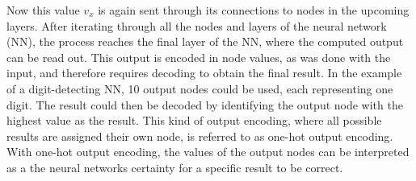 Now this value $v_x$ is again sent through its connections to nodes in the upcoming layers.
After iterating through all the nodes and layers of the neural network (NN), the process reaches the final layer of the NN, where the computed output can be read out.
This output is encoded in node values, as was done with the input, and therefore requires decoding to obtain the final result.
In the example of a digit-detecting NN, 10 output nodes could be used, each representing one digit.
The result could then be decoded by identifying the output node with the highest value as the result.
This kind of output encoding, where all possible results are assigned their own node, is referred to as one-hot output encoding\cite{Brownlee2020}.
With one-hot output encoding, the values of the output nodes can be interpreted as a the neural networks certainty for a specific result to be correct.

